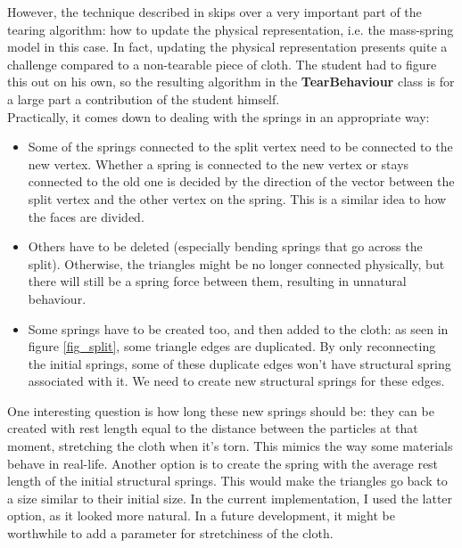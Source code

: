 However, the technique described in \cite{fast_sim_tearing} skips over a very important part of the tearing algorithm: how to update the physical representation, i.e. the mass-spring model in this case. In fact, updating the physical representation presents quite a challenge compared to a non-tearable piece of cloth. The student had to figure this out on his own, so the resulting algorithm in the {\bf TearBehaviour} class is for a large part a contribution of the student himself.\\

Practically, it comes down to dealing with the springs in an appropriate way:
\begin{itemize}
\item Some of the springs connected to the split vertex need to be connected to the new vertex. Whether a spring is connected to the new vertex or stays connected to the old one is decided by the direction of the vector between the split vertex and the other vertex on the spring. This is a similar idea to how the faces are divided.
\item Others have to be deleted (especially bending springs that go across the split). Otherwise, the triangles might be no longer connected physically, but there will still be a spring force between them, resulting in unnatural behaviour.
\item Some springs have to be created too, and then added to the cloth: as seen in figure \ref{fig_split}, some triangle edges are duplicated. By only reconnecting the initial springs, some of these duplicate edges won't have structural spring associated with it. We need to create new structural springs for these edges.
\end{itemize}
One interesting question is how long these new springs should be: they can be created with rest length equal to the distance between the particles at that moment, stretching the cloth when it's torn. This mimics the way some materials behave in real-life. Another option is to create the spring with the average rest length of the initial structural springs. This would make the triangles go back to a size similar to their initial size. In the current implementation, I used the latter option, as it looked more natural. In a future development, it might be worthwhile to add a parameter for stretchiness of the cloth.\\

